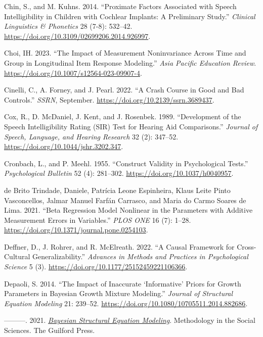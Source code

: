\documentclass[
sn-apacite
]{sn-jnl}
\newlength{\cslhangindent}
\newenvironment{CSLReferences}[2] %
 {\begin{list}{}{%
  \setlength{\itemindent}{0pt}
  \setlength{\leftmargin}{0pt}
  \setlength{\parsep}{0pt}
  \ifodd #1
   \setlength{\leftmargin}{\cslhangindent}
   \setlength{\itemindent}{-1\cslhangindent}
  \fi
  \setlength{\itemsep}{#2\baselineskip}}}
 {\end{list}}
\begin{document}
\begin{CSLReferences}{1}{0}
Chin, S., and M. Kuhns. 2014. {``Proximate Factors Associated with
Speech Intelligibility in Children with Cochlear Implants: A Preliminary
Study.''} \emph{Clinical Linguistics \& Phonetics} 28 (7-8): 532--42.
\url{https://doi.org/10.3109/02699206.2014.926997}.

Choi, IH. 2023. {``The Impact of Measurement Noninvariance Across Time
and Group in Longitudinal Item Response Modeling.''} \emph{Asia Pacific
Education Review}. \url{https://doi.org/10.1007/s12564-023-09907-4}.

Cinelli, C., A. Forney, and J. Pearl. 2022. {``A Crash Course in Good
and Bad Controls.''} \emph{SSRN}, September.
\url{https://doi.org/10.2139/ssrn.3689437}.

Cox, R., D. McDaniel, J. Kent, and J. Rosenbek. 1989. {``Development of
the Speech Intelligibility Rating (SIR) Test for Hearing Aid
Comparisons.''} \emph{Journal of Speech, Language, and Hearing Research}
32 (2): 347--52. \url{https://doi.org/10.1044/jshr.3202.347}.

Cronbach, L., and P. Meehl. 1955. {``Construct Validity in Psychological
Tests.''} \emph{Psychological Bulletin} 52 (4): 281--302.
\url{https://doi.org/10.1037/h0040957}.

de Brito Trindade, Daniele, Patrícia Leone Espinheira, Klaus Leite Pinto
Vasconcellos, Jalmar Manuel Farfán Carrasco, and Maria do Carmo Soares
de Lima. 2021. {``Beta Regression Model Nonlinear in the Parameters with
Additive Measurement Errors in Variables.''} \emph{PLOS ONE} 16 (7):
1--28. \url{https://doi.org/10.1371/journal.pone.0254103}.

Deffner, D., J. Rohrer, and R. McElreath. 2022. {``A Causal Framework
for Cross-Cultural Generalizability.''} \emph{Advances in Methods and
Practices in Psychological Science} 5 (3).
\url{https://doi.org/10.1177/25152459221106366}.

Depaoli, S. 2014. {``The Impact of Inaccurate {`Informative'} Priors for
Growth Parameters in Bayesian Growth Mixture Modeling.''} \emph{Journal
of Structural Equation Modeling} 21: 239--52.
\url{https://doi.org/10.1080/10705511.2014.882686}.

---------. 2021. \emph{\href{}{Bayesian Structural Equation Modeling}}.
Methodology in the Social Sciences. The Guilford Press.


\end{CSLReferences}
\end{document}
